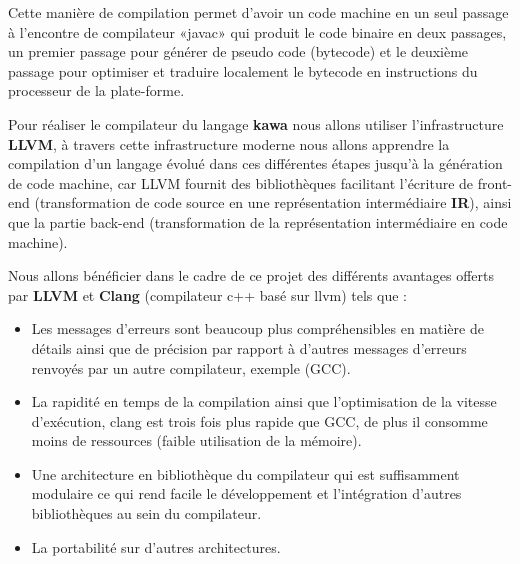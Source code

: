 \documentclass{../res/univ-projet}
\begin{document}
 Cette manière de compilation permet d'avoir un code machine en un seul passage à l'encontre de compilateur «javac» qui produit le code binaire en deux passages, un premier passage  pour générer de pseudo code (bytecode) et le deuxième passage  pour optimiser et traduire localement le bytecode en instructions du processeur de la plate-forme.

Pour réaliser le compilateur du langage \textbf {kawa} nous allons utiliser l'infrastructure \textbf {LLVM}, à travers cette infrastructure moderne nous allons apprendre la compilation d'un langage évolué dans ces différentes étapes jusqu'à la génération de code machine, car LLVM fournit des bibliothèques facilitant l’écriture de front-end (transformation de code source en une représentation intermédiaire \textbf {IR}), ainsi que la partie  back-end (transformation de la représentation intermédiaire en code machine).

Nous allons  bénéficier dans le cadre de ce projet des différents avantages offerts par \textbf {LLVM} et \textbf {Clang} (compilateur c++ basé sur llvm) tels que :
\begin{itemize}
\item Les messages d’erreurs sont beaucoup plus compréhensibles en matière de détails ainsi que de précision par rapport à d'autres messages d'erreurs renvoyés par un autre compilateur, exemple (GCC).
\item La rapidité en temps de la compilation ainsi que l'optimisation de la vitesse d'exécution, clang est trois fois plus rapide que GCC, de plus il consomme moins de ressources (faible utilisation de la mémoire).
\item Une architecture en bibliothèque du compilateur qui est suffisamment modulaire ce qui rend facile le développement et l'intégration d'autres bibliothèques au sein du compilateur.
\item La portabilité sur d'autres architectures.
\end{itemize}

\end{document}
